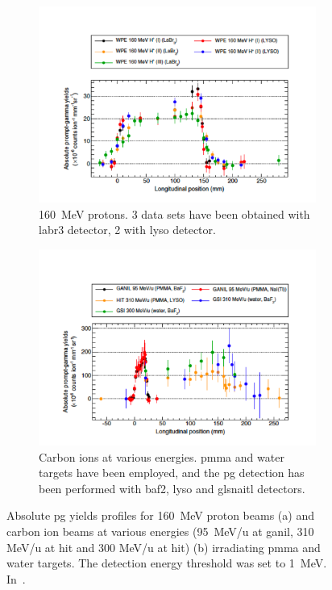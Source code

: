 \begin{figure}
\centering
\begin{subfigure}[t]{.49\textwidth}
\hspace{-0.7cm}\includegraphics[width=1.2\linewidth]{03_GraphicFiles/chapter2_GammaCameras/PG_absYields_p.pdf}
\caption{160~MeV protons. 3 data sets have been obtained with \gls{labr3} detector, 2 with \gls{lyso} detector.}
\label{chap2::fig::PG_absYields_p}
\end{subfigure}
\begin{subfigure}[t]{.49\textwidth}
\hspace{-0.7cm}\includegraphics[width=1.2\linewidth]{03_GraphicFiles/chapter2_GammaCameras/PG_absYields_C.pdf}
\caption{Carbon ions at various energies. \gls{pmma} and water targets have been employed, and the \gls{pg} detection has been performed with \gls{baf2}, \gls{lyso} and gls{naitl} detectors.}
\label{chap2::fig::PG_absYields_C}
\end{subfigure}
\caption{Absolute \gls{pg} yields profiles for 160~MeV proton beams (a) and carbon ion beams at various energies (95~MeV/u at \gls{ganil}, 310 MeV/u at \gls{hit} and 300 MeV/u at \gls{hit}) (b) irradiating \gls{pmma} and water targets.  The detection energy threshold was set to 1~MeV. In~\cite{Pinto2015}.}
\label{chap2::fig::PG_yields}
\end{figure}

